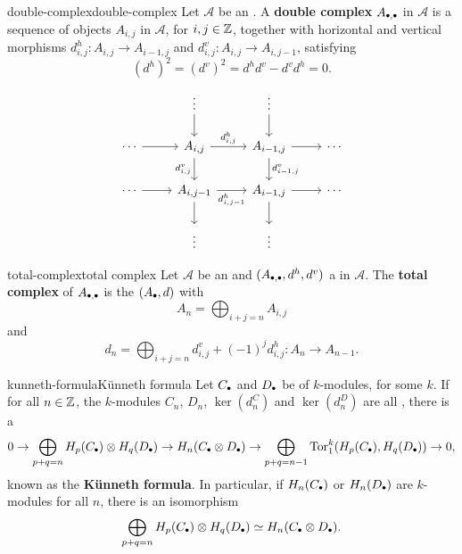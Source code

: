 \begin{topic}{double-complex}{double-complex}
    Let $\mathcal{A}$ be an . A \textbf{double complex} $A_{\bdot, \bdot}$ in $\mathcal{A}$ is a sequence of objects $A_{i, j}$ in $\mathcal{A}$, for $i, j \in \mathbb{Z}$, together with horizontal and vertical morphisms $d^h_{i, j} : A_{i, j} \to A_{i - 1, j}$ and $d^v_{i, j} : A_{i, j} \to A_{i, j - 1}$, satisfying
    \[ (d^h)^2 = (d^v)^2 = d^h d^v - d^v d^h = 0 . \]
    \[ \begin{tikzcd}
        & \vdots \arrow{d} & \vdots \arrow{d} & \\
        \cdots \arrow{r} & A_{i, j} \arrow{r}{d^h_{i, j}} \arrow[swap]{d}{d^v_{i, j}} & A_{i - 1, j} \arrow{r} \arrow{d}{d^v_{i - 1, j}} & \cdots \\
        \cdots \arrow{r} & A_{i, j - 1} \arrow[swap]{r}{d^h_{i, j - 1}} \arrow{d} & A_{i - 1, j} \arrow{r} \arrow{d} & \cdots \\
         & \vdots & \vdots & 
    \end{tikzcd} \]
\end{topic}

\begin{topic}{total-complex}{total complex}
    Let $\mathcal{A}$ be an  and $(A_{\bdot, \bdot}, d^h, d^v)$ a  in $\mathcal{A}$. The \textbf{total complex} of $A_{\bdot, \bdot}$ is the  $(A_\bdot, d)$ with
    \[ A_n = \bigoplus_{i + j = n} A_{i, j} \]
    and
    \[ d_n = \bigoplus_{i + j = n} d^v_{i, j} + (-1)^j d^h_{i, j} : A_n \to A_{n - 1} . \]
\end{topic}

\begin{topic}{kunneth-formula}{Künneth formula}
    Let $C_\bdot$ and $D_\bdot$ be  of $k$-modules, for some  $k$. If for all $n \in \mathbb{Z}$, the $k$-modules $C_n$, $D_n$, $\ker(d_n^C)$ and $\ker(d_n^D)$ are all , there is a 
    \[ 0 \to \bigoplus_{p + q = n} H_p(C_\bdot) \otimes H_q(D_\bdot) \to H_n(C_\bdot \otimes D_\bdot) \to \bigoplus_{p + q = n - 1} \textup{Tor}_1^k(H_p(C_\bdot), H_q(D_\bdot)) \to 0 , \]
    known as the \textbf{Künneth formula}. In particular, if $H_n(C_\bdot)$ or $H_n(D_\bdot)$ are  $k$-modules for all $n$, there is an isomorphism
    \[ \bigoplus_{p + q = n} H_p(C_\bdot) \otimes H_q(D_\bdot) \simeq H_n(C_\bdot \otimes D_\bdot) . \]
\end{topic}
